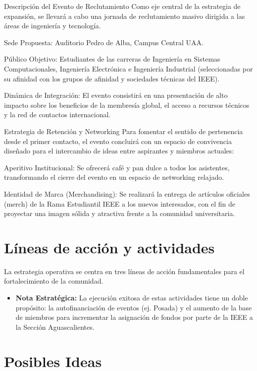 \documentclass[11pt,a4paper]{article}
\begin{document}
Descripción del Evento de Reclutamiento
Como eje central de la estrategia de expansión, se llevará a cabo una jornada de reclutamiento masivo dirigida a las áreas de ingeniería y tecnología.

Sede Propuesta: Auditorio Pedro de Alba, Campus Central UAA.

Público Objetivo: Estudiantes de las carreras de Ingeniería en Sistemas Computacionales, Ingeniería Electrónica e Ingeniería Industrial (seleccionadas por su afinidad con los grupos de afinidad y sociedades técnicas del IEEE).

Dinámica de Integración: El evento consistirá en una presentación de alto impacto sobre los beneficios de la membresía global, el acceso a recursos técnicos y la red de contactos internacional.

Estrategia de Retención y Networking
Para fomentar el sentido de pertenencia desde el primer contacto, el evento concluirá con un espacio de convivencia diseñado para el intercambio de ideas entre aspirantes y miembros actuales:

Aperitivo Institucional: Se ofrecerá café y pan dulce a todos los asistentes, transformando el cierre del evento en un espacio de networking relajado.

Identidad de Marca (Merchandising): Se realizará la entrega de artículos oficiales (merch) de la Rama Estudiantil IEEE a los nuevos interesados, con el fin de proyectar una imagen sólida y atractiva frente a la comunidad universitaria.
\section{Líneas de acción y actividades}

La estrategia operativa se centra en tres líneas de acción fundamentales para el fortalecimiento de la comunidad.

\begin{itemize}[leftmargin=1.5cm]
    \item \textbf{Nota Estratégica:} La ejecución exitosa de estas actividades tiene un doble propósito: la autofinanciación de eventos (ej. Posada) y el aumento de la base de miembros para incrementar la asignación de fondos por parte de la IEEE a la Sección Aguascalientes.
\end{itemize}

\section{Posibles Ideas}
\end{document}
